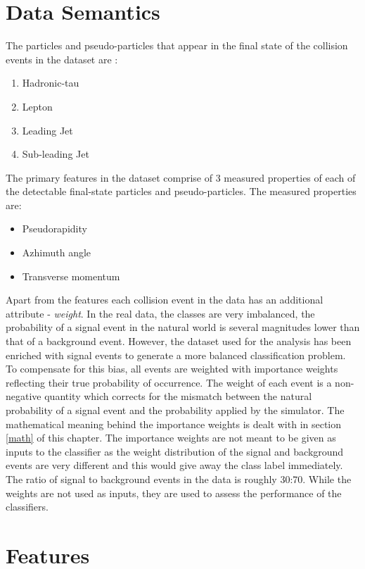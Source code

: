 \section{Data Semantics}

The particles and pseudo-particles that appear in the final state of the collision events in the dataset are :

\begin{enumerate}[noitemsep]
\item{Hadronic-tau} 
\item{Lepton} 
\item{Leading Jet}
\item{Sub-leading Jet}
\end{enumerate}

The primary features in the dataset comprise of 3 measured properties of each of the detectable final-state particles and pseudo-particles. The measured properties are:

\begin{itemize}[noitemsep]
\item Pseudorapidity 
\item{Azhimuth angle} 
\item{Transverse momentum}
\end{itemize}

Apart from the features each collision event in the data has an additional attribute - \textit{weight}. In the real data, the classes are very imbalanced, the probability of a signal event in the natural world  is several magnitudes lower than that of a background event. However, the dataset used for the analysis has been enriched with signal events to generate a more balanced classification problem. To compensate for this bias, all events are weighted with importance weights reflecting their true probability of occurrence. The weight of each event is a non-negative quantity which corrects for the mismatch between the natural probability of a signal event and the probability applied by the simulator. The mathematical meaning behind the importance weights is dealt with in section \ref{math} of this chapter. The importance weights are not meant to be given as inputs to the classifier as the weight distribution of the signal and background events are very different and this would give away the class label immediately. The ratio of signal to background events in the data is roughly 30:70. While the weights are not used as inputs, they are used to assess the performance of the classifiers. 

\section{Features}
\label{features}

